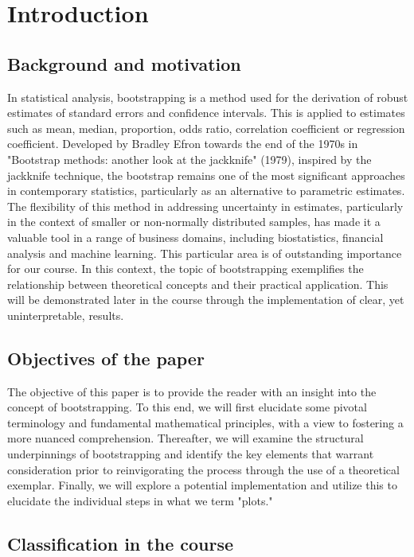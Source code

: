
\chapter{Introduction} \label{Introduction}


\section{Background and motivation} \label{Background and motivation}
In statistical analysis, bootstrapping is a method used for the derivation of robust estimates of standard errors and confidence intervals. This is applied to estimates such as mean, median, proportion, odds ratio, correlation coefficient or regression coefficient. Developed by Bradley Efron towards the end of the 1970s in "Bootstrap methods: another look at the jackknife" (1979), inspired by the jackknife technique, the bootstrap remains one of the most significant approaches in contemporary statistics, particularly as an alternative to parametric estimates.
The flexibility of this method in addressing uncertainty in estimates, particularly in the context of smaller or non-normally distributed samples, has made it a valuable tool in a range of business domains, including biostatistics, financial analysis and machine learning. This particular area is of outstanding importance for our course.
In this context, the topic of bootstrapping exemplifies the relationship between theoretical concepts and their practical application. This will be demonstrated later in the course through the implementation of clear, yet uninterpretable, results. 


\section{Objectives of the paper}
The objective of this paper is to provide the reader with an insight into the concept of bootstrapping. To this end, we will first elucidate some pivotal terminology and fundamental mathematical principles, with a view to fostering a more nuanced comprehension. Thereafter, we will examine the structural underpinnings of bootstrapping and identify the key elements that warrant consideration prior to reinvigorating the process through the use of a theoretical exemplar. Finally, we will explore a potential implementation and utilize this to elucidate the individual steps in what we term "plots." 

\section{Classification in the course}






